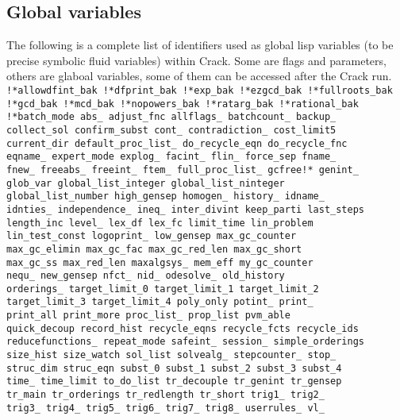 \documentclass[12pt]{article}
\begin{document}
\subsection{Global variables}
The following is a complete list of identifiers used as global
lisp variables (to be precise symbolic fluid variables) 
within {\sc Crack}. Some are flags and parameters, others are glaboal
variables, some of them can be accessed after the {\sc Crack}
run. \vspace{6pt} \\
\noindent
{\tt !*allowdfint\_bak !*dfprint\_bak !*exp\_bak !*ezgcd\_bak !*fullroots\_bak \\
!*gcd\_bak !*mcd\_bak !*nopowers\_bak !*ratarg\_bak !*rational\_bak \\
!*batch\_mode abs\_ adjust\_fnc allflags\_ batchcount\_ backup\_ \\
collect\_sol confirm\_subst cont\_ contradiction\_ cost\_limit5 \\
current\_dir default\_proc\_list\_ do\_recycle\_eqn do\_recycle\_fnc \\
eqname\_ expert\_mode explog\_ facint\_ flin\_ force\_sep fname\_ \\
fnew\_ freeabs\_ freeint\_ ftem\_ full\_proc\_list\_ gcfree!* genint\_ \\
glob\_var global\_list\_integer global\_list\_ninteger \\
global\_list\_number high\_gensep homogen\_ history\_ idname\_ \\
idnties\_ independence\_ ineq\_ inter\_divint keep\_parti last\_steps \\
length\_inc level\_ lex\_df lex\_fc limit\_time lin\_problem \\
lin\_test\_const logoprint\_ low\_gensep max\_gc\_counter \\
max\_gc\_elimin max\_gc\_fac max\_gc\_red\_len max\_gc\_short \\
max\_gc\_ss max\_red\_len maxalgsys\_ mem\_eff my\_gc\_counter \\
nequ\_ new\_gensep nfct\_ nid\_ odesolve\_ old\_history \\
orderings\_ target\_limit\_0 target\_limit\_1 target\_limit\_2 \\
target\_limit\_3 target\_limit\_4 poly\_only potint\_ print\_ \\
print\_all print\_more proc\_list\_ prop\_list pvm\_able \\
quick\_decoup record\_hist recycle\_eqns recycle\_fcts recycle\_ids \\
reducefunctions\_ repeat\_mode safeint\_ session\_ simple\_orderings \\
size\_hist size\_watch sol\_list solvealg\_ stepcounter\_ stop\_ \\
struc\_dim struc\_eqn subst\_0 subst\_1 subst\_2 subst\_3 subst\_4 \\
time\_ time\_limit to\_do\_list tr\_decouple tr\_genint tr\_gensep \\
tr\_main tr\_orderings tr\_redlength tr\_short trig1\_ trig2\_ \\
trig3\_ trig4\_ trig5\_ trig6\_ trig7\_ trig8\_ userrules\_ vl\_}
\end{document}
